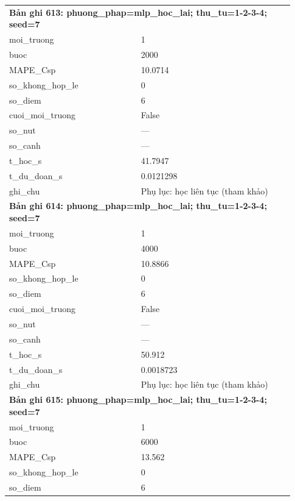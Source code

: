 \begin{longtable}{p{0.43\linewidth}p{0.50\linewidth}}
\midrule
\multicolumn{2}{p{0.95\linewidth}}{\textbf{Bản ghi 613: phuong\_phap=mlp\_hoc\_lai; thu\_tu=1-2-3-4; seed=7}} \\
moi\_\allowbreak truong & 1 \\
buoc & 2000 \\
MAPE\_\allowbreak Csp & 10.0714 \\
so\_\allowbreak khong\_\allowbreak hop\_\allowbreak le & 0 \\
so\_\allowbreak diem & 6 \\
cuoi\_\allowbreak moi\_\allowbreak truong & False \\
so\_\allowbreak nut & — \\
so\_\allowbreak canh & — \\
t\_\allowbreak hoc\_\allowbreak s & 41.7947 \\
t\_\allowbreak du\_\allowbreak doan\_\allowbreak s & 0.0121298 \\
ghi\_\allowbreak chu & Phụ lục: học liên tục (tham khảo) \\
\midrule
\multicolumn{2}{p{0.95\linewidth}}{\textbf{Bản ghi 614: phuong\_phap=mlp\_hoc\_lai; thu\_tu=1-2-3-4; seed=7}} \\
moi\_\allowbreak truong & 1 \\
buoc & 4000 \\
MAPE\_\allowbreak Csp & 10.8866 \\
so\_\allowbreak khong\_\allowbreak hop\_\allowbreak le & 0 \\
so\_\allowbreak diem & 6 \\
cuoi\_\allowbreak moi\_\allowbreak truong & False \\
so\_\allowbreak nut & — \\
so\_\allowbreak canh & — \\
t\_\allowbreak hoc\_\allowbreak s & 50.912 \\
t\_\allowbreak du\_\allowbreak doan\_\allowbreak s & 0.0018723 \\
ghi\_\allowbreak chu & Phụ lục: học liên tục (tham khảo) \\
\midrule
\multicolumn{2}{p{0.95\linewidth}}{\textbf{Bản ghi 615: phuong\_phap=mlp\_hoc\_lai; thu\_tu=1-2-3-4; seed=7}} \\
moi\_\allowbreak truong & 1 \\
buoc & 6000 \\
MAPE\_\allowbreak Csp & 13.562 \\
so\_\allowbreak khong\_\allowbreak hop\_\allowbreak le & 0 \\
so\_\allowbreak diem & 6 \\

\end{longtable}
